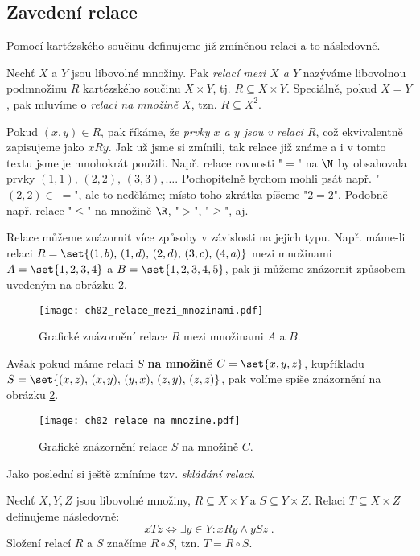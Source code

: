 \subsection{Zavedení relace}
Pomocí kartézského součinu definujeme již zmíněnou relaci a to následovně.
\begin{definition}[Relace]\label{def:relace}
    Nechť $X$ a $Y$ jsou libovolné množiny. Pak \emph{relací mezi $X$ a $Y$} nazýváme libovolnou podmnožinu $R$ kartézského součinu $X\times Y$, tj. $R\subseteq X \times Y$. Speciálně, pokud $X=Y$, pak mluvíme o \emph{relaci na množině $X$}, tzn. $R\subseteq X^2$.
\end{definition}
Pokud $(x,y)\in R$, pak říkáme, že \emph{prvky $x$ a $y$ jsou v relaci $R$}, což ekvivalentně zapisujeme jako $xRy$. Jak už jsme si zmínili, tak relace již známe a i v tomto textu jsme je mnohokrát použili. Např. relace rovnosti "$=$" na $\N$ by obsahovala prvky $(1,1),\,(2,2),\,(3,3),\ldots$. Pochopitelně bychom mohli psát např. "$(2,2)\in\;=$", ale to neděláme; místo toho zkrátka píšeme "$2=2$". Podobně např. relace "$\leq$" na množině $\R$, "$>$", "$\geq$", aj.\par
Relace můžeme znázornit více způsoby v závislosti na jejich typu. Např. máme-li relaci $R=\set{(1,b),\,(1,d),\,(2,d),\,(3,c),\,(4,a)}$ mezi množinami $A=\set{1,2,3,4}$ a $B=\set{1,2,3,4,5}$, pak ji můžeme znázornit způsobem uvedeným na obrázku \ref{fig:relace_mezi_mnozinami}.
\begin{figure}[h]
    \centering
    \texttt{[image: ch02\_relace\_mezi\_mnozinami.pdf]}
    \caption{Grafické znázornění relace $R$ mezi množinami $A$ a $B$.}
    \label{fig:relace_mezi_mnozinami}
\end{figure}
Avšak pokud máme relaci $S$ \textbf{na množině} $C=\set{x,y,z}$, kupříkladu $S=\set{(x,z),\,(x,y),\,(y,x),\,(z,y),\,(z,z)}$, pak volíme spíše znázornění na obrázku \ref{fig:relace_mezi_mnozinami}.
\begin{figure}[h]
    \centering
    \texttt{[image: ch02\_relace\_na\_mnozine.pdf]}
    \caption{Grafické znázornění relace $S$ na množině $C$.}
    \label{fig:relace_mezi_mnozinami}
\end{figure}
Jako poslední si ještě zmíníme tzv. \emph{skládání relací}.
\begin{definition}\label{def:skladani_relaci}
    Nechť $X,Y,Z$ jsou libovolné množiny, $R\subseteq X\times Y$ a $S\subseteq Y\times Z$. Relaci $T\subseteq X\times Z$ definujeme následovně:
    \begin{equation*}
        xTz \iff \exists y\in Y : xRy \land ySz\; .
    \end{equation*}
    Složení relací $R$ a $S$ značíme $R\circ S$, tzn. $T=R\circ S$.
\end{definition}
